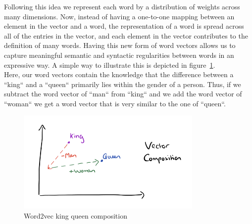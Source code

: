 Following this idea we represent each word by a distribution of weights across many dimensions. Now, instead of having a one-to-one mapping between an element in the vector and a word, the representation of a word is spread across all of the entries in the vector, and each element in the vector contributes to the definition of many words. Having this new form of word vectors allows us to capture meaningful semantic and syntactic regularities between words in an expressive way. A simple way to illustrate this is depicted in figure~\ref{fig:word2vec_king_queen_composition}. \\
Here, our word vectors contain the knowledge that the difference between a “king“ and a “queen“ primarily lies within the gender of a person. Thus, if we subtract the word vector of “man“ from “king“ and we add the word vector of “woman“ we get a word vector that is very similar to the one of “queen“.

\begin{figure}[h]
  \includegraphics[height=5cm]{img/word2vec-king-queen-composition}
  \caption{Word2vec king queen composition}
\label{fig:word2vec_king_queen_composition}
\end{figure}


